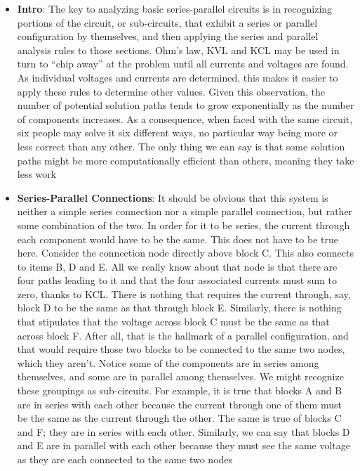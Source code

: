 \documentclass{report}
\begin{document}
    \begin{itemize}
        \item \textbf{Intro}: The key to analyzing basic series-parallel circuits is in recognizing portions of the circuit, or sub-circuits, that exhibit a series or parallel configuration by themselves, and then applying the series and parallel analysis rules to those sections. Ohm's law, KVL and KCL may be used in turn to “chip away” at the problem until all currents and voltages are found. As individual voltages and currents are determined, this makes it easier to apply these rules to determine other values. Given this observation, the number of potential solution paths tends to grow exponentially as the number of components increases. As a consequence, when faced with the same circuit, six people may solve it six different ways, no particular way being more or less correct than any other. The only thing we can say is that some solution paths might be more computationally efficient than others, meaning they take less work 
        \item \textbf{Series-Parallel Connections}: 
            \bigbreak \noindent 
            \bigbreak \noindent 
            It should be obvious that this system is neither a simple series connection nor a simple parallel connection, but rather some combination of the two. In order for it to be series, the current through each component would have to be the same. This does not have to be true here. Consider the connection node directly above block C. This also connects to items B, D and E. All we really know about that node is that there are four paths leading to it and that the four associated currents must sum to zero, thanks to KCL. There is nothing that requires the current through, say, block D to be the same as that through block E. Similarly, there is nothing that stipulates that the voltage across block C must be the same as that across block F. After all, that is the hallmark of a parallel configuration, and that would require those two blocks to be connected to the same two nodes, which they aren't.
            \bigbreak \noindent 
            Notice some of the components are in series among themselves, and some are in parallel among themselves. We might recognize these groupings as sub-circuits.
            \bigbreak \noindent 
            For example, it is true that blocks A and B are in series with each other because the current through one of them must be the same as the current through the other. The same is true of blocks C and F; they are in series with each other. Similarly, we can say that blocks D and E are in parallel with each other because they must see the same voltage as they are each connected to the same two nodes

\end{itemize}
\end{document}
